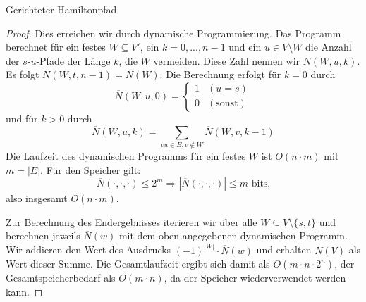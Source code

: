 \begin{section}{Gerichteter Hamiltonpfad}
\begin{proof}
    Dies erreichen wir durch dynamische Programmierung. Das Programm berechnet für ein festes \(W \subseteq V'\), ein \(k = 0,...,n-1\) und ein \(u \in V \setminus W\) die Anzahl der \(s\)-\(u\)-Pfade der Länge \(k\), die \(W\) vermeiden. Diese Zahl nennen wir \(\overline{N}(W,u,k)\). Es folgt \(\overline{N}(W,t,n-1) = \overline{N}(W)\). Die Berechnung erfolgt für \(k = 0\) durch
    \[
      \overline{N}(W,u,0) = 
      \begin{cases}
        1 & (u = s) \\
        0 & (\text{sonst})
      \end{cases}
    \]
    und für \(k > 0\) durch
    \[
      \overline{N}(W,u,k) = \sum_{vu \in E, v \notin W} \overline{N}(W,v,k-1)
    \]
    Die Laufzeit des dynamischen Programms für ein festes \(W\) ist \( O(n \cdot m) \) mit \(m = |E|\). Für den Speicher gilt:
    \[\overline{N}(\cdot,\cdot,\cdot) \leq 2^m \Rightarrow |\overline{N}(\cdot,\cdot,\cdot)| \leq m \text{ bits,}\]
    also insgesamt $O(n\cdot m)$.
    
    Zur Berechnung des Endergebnisses iterieren wir über alle \(W \subseteq V \setminus \{s,t\}\) und berechnen jeweils \( \overline{N}(w) \) mit dem oben angegebenen dynamischen Programm. Wir addieren den Wert des Ausdrucks \( (-1)^{|W|} \cdot \overline{N}(w) \) und erhalten \(N(V)\) als Wert dieser Summe. Die Gesamtlaufzeit ergibt sich damit als \(O(m \cdot n \cdot 2^n)\), der Gesamtspeicherbedarf als \(O(m \cdot n)\), da der Speicher wiederverwendet werden kann.
  \end{proof}
\end{section}
  
